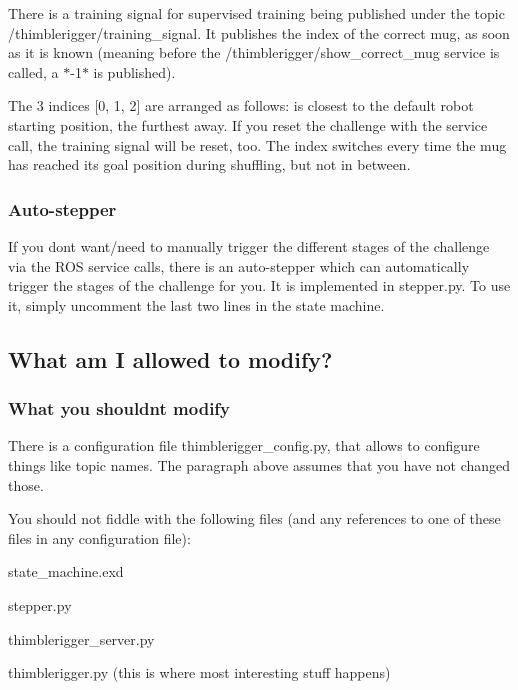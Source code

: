 There is a training signal for supervised training being published under the topic {\ttfamily /thimblerigger/training\+\_\+signal}. It publishes the index of the correct mug, as soon as it is known (meaning before the {\ttfamily /thimblerigger/show\+\_\+correct\+\_\+mug} service is called, a $\ast$-\/1$\ast$ is published).

The 3 indices {\ttfamily \mbox{[}0, 1, 2\mbox{]}} are arranged as follows\+: {} is closest to the default robot starting position, {} the furthest away. If you reset the challenge with the service call, the training signal will be reset, too. The index switches every time the mug has reached its goal position during shuffling, but not in between.

\subsubsection*{Auto-\/stepper}

If you don\textquotesingle{}t want/need to manually trigger the different stages of the challenge via the R\+OS service calls, there is an auto-\/stepper which can automatically trigger the stages of the challenge for you. It is implemented in stepper.\+py. To use it, simply uncomment the last two lines in the state machine.

\subsection*{What am I allowed to modify?}

\subsubsection*{What you shouldn\textquotesingle{}t modify}

There is a configuration file {\ttfamily thimblerigger\+\_\+config.\+py}, that allows to configure things like topic names. The paragraph above assumes that you have not changed those.

You should not fiddle with the following files (and any references to one of these files in any configuration file)\+:


\begin{DoxyItemize}
\item {\ttfamily state\+\_\+machine.\+exd}
\item {\ttfamily stepper.\+py}
\item {\ttfamily thimblerigger\+\_\+server.\+py}
\item {\ttfamily thimblerigger.\+py} (this is where most interesting stuff happens)
\end{DoxyItemize}

